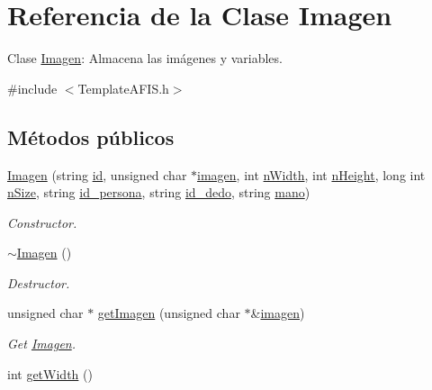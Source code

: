 \hypertarget{classImagen}{}\section{Referencia de la Clase Imagen}
\label{classImagen}


Clase \hyperlink{classImagen}{Imagen}\+: Almacena las imágenes y variables.  




{\ttfamily \#include $<$Template\+A\+F\+I\+S.\+h$>$}

\subsection*{Métodos públicos}
\begin{DoxyCompactItemize}
\item 
\hyperlink{classImagen_a806163aa3eaf4022030a49275ddf4d2b}{Imagen} (string \hyperlink{classImagen_a92940ae8127167d1a7041a365555a931}{id}, unsigned char $\ast$\hyperlink{classImagen_a8485fa6dd60a7f067e2d2066599314b0}{imagen}, int \hyperlink{classImagen_a7b9235e12e5cc50f29614e9c08d72c4f}{n\+Width}, int \hyperlink{classImagen_a92935096f7cbcc6ffe32dde43038288c}{n\+Height}, long int \hyperlink{classImagen_adb26157b4817c521f092f024d28b9435}{n\+Size}, string \hyperlink{classImagen_aef38d4f4f82b0f19b4b13b20d66e38ba}{id\+\_\+persona}, string \hyperlink{classImagen_abdf777e9a6d41cb3b6ee54e9702d0e52}{id\+\_\+dedo}, string \hyperlink{classImagen_a6ac88dc4f15daed005f1055235020821}{mano})
\begin{DoxyCompactList}\small\item\em Constructor. \end{DoxyCompactList}\item 
\hyperlink{classImagen_a03dd93c9cf920a9dc0b72f8bd34f2e8a}{$\sim$\+Imagen} ()
\begin{DoxyCompactList}\small\item\em Destructor. \end{DoxyCompactList}\item 
unsigned char $\ast$ \hyperlink{classImagen_a676804752c281116609460f738b74924}{get\+Imagen} (unsigned char $\ast$\&\hyperlink{classImagen_a8485fa6dd60a7f067e2d2066599314b0}{imagen})
\begin{DoxyCompactList}\small\item\em Get \hyperlink{classImagen}{Imagen}. \end{DoxyCompactList}\item 
int \hyperlink{classImagen_a4f973d4f8e63503c3e0b4649a95e0188}{get\+Width} ()

\end{DoxyCompactItemize}

